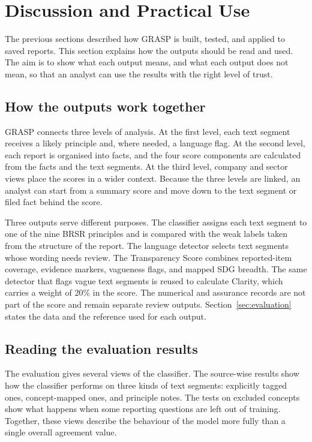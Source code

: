 \section{Discussion and Practical Use}
\label{sec:discussion}

The previous sections described how GRASP is built, tested, and applied to saved reports. This section explains how the outputs should be read and used. The aim is to show what each output means, and what each output does not mean, so that an analyst can use the results with the right level of trust.

\subsection{How the outputs work together}

GRASP connects three levels of analysis. At the first level, each text segment receives a likely principle and, where needed, a language flag. At the second level, each report is organised into facts, and the four score components are calculated from the facts and the text segments. At the third level, company and sector views place the scores in a wider context. Because the three levels are linked, an analyst can start from a summary score and move down to the text segment or filed fact behind the score.

Three outputs serve different purposes. The classifier assigns each text segment to one of the nine BRSR principles and is compared with the weak labels taken from the structure of the report. The language detector selects text segments whose wording needs review. The Transparency Score combines reported-item coverage, evidence markers, vagueness flags, and mapped SDG breadth. The same detector that flags vague text segments is reused to calculate Clarity, which carries a weight of 20\% in the score. The numerical and assurance records are not part of the score and remain separate review outputs. Section~\ref{sec:evaluation} states the data and the reference used for each output.

\subsection{Reading the evaluation results}

The evaluation gives several views of the classifier. The source-wise results show how the classifier performs on three kinds of text segments: explicitly tagged ones, concept-mapped ones, and principle notes. The tests on excluded concepts show what happens when some reporting questions are left out of training. Together, these views describe the behaviour of the model more fully than a single overall agreement value.

